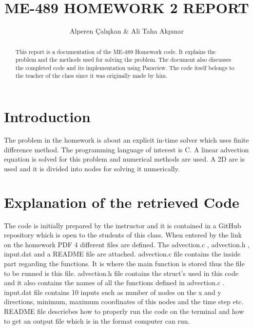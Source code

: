 \documentclass{article}
\title{ME-489 HOMEWORK 2 REPORT}
\author{Alperen Çalışkan & Ali Taha Akpınar}
\begin{document}
\maketitle
\begin{abstract}

This report is a documentation of the ME-489 Homework code. It explains the problem and the methods used for solving the problem. The document also discusses the completed code and its implementation using Paraview. The code itself belongs to the teacher of the class since it was originally made by him. 

\end{abstract}

\section{Introduction}

The problem in the homework is about an explicit in-time solver which uses finite difference method. The programming language of interest is C. 
A linear advection equation is solved for this problem and numerical methods are used. A 2D are is used and it is divided into nodes for solving it numerically. 


\section{Explanation of the retrieved Code}

The code is initially prepared by the instructor and it is contained in a GitHub repository which is open to the students of this class. When entered by the link on the homework PDF 4 different files are defined. The advection.c , advection.h , input.dat and a README file are attached. advection.c file contains the inside part regarding the functions. It is where the main function is stored thus the file to be runned is this file. advection.h file contains the struct's used in this code and it also contains the names of all the functions defined in advection.c . input.dat file contains 10 inputs such as number of nodes on the x and y directions, minimum, maximum coordinates of this nodes and the time step etc. README file descriebes how to properly run the code on the terminal and how to get an output file which is in the format computer can run. 
\end{document}
